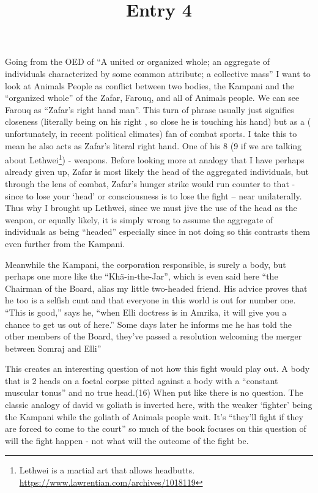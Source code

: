 \documentclass{article}
\title{Entry 4}
\begin{document}
\paragraph{}

Going from the OED of ``A united or organized whole; an aggregate of individuals characterized
by some common attribute; a collective mass'' I want to look at Animals People as conflict between two bodies, the Kampani and the ``organized whole'' of the Zafar, Farouq, and all of Animals people. 
We can see Farouq as ``Zafar’s right hand man''. This turn of phrase usually just signifies closeness (literally being on his right , so close he is touching his hand) but as a ( unfortunately, in recent political climates) fan of combat sports. I take this to mean he also acts as Zafar's literal right hand. One of his 8 (9 if we are talking about Lethwei\footnote{Lethwei is a martial art that allows headbutts. \url{https://www.lawrentian.com/archives/1018119}})  - weapons. Before looking more at analogy that I have perhaps already given up, Zafar is most likely the head of the aggregated individuals, but through the lens of combat, Zafar's hunger strike would run counter to that - since to lose your `head' or consciousness  is to lose the fight -- near unilaterally. Thus why I brought up Lethwei, since we must jive the use of the head as the weapon, or equally likely, it is simply wrong to assume the aggregate of individuals as being ``headed'' especially since in not doing so this contrasts them even further from the Kampani.

Meanwhile the Kampani, the corporation responsible, is surely a body, but perhaps one more like the ``Khã-in-the-Jar'', which is even said here ``the Chairman of the Board, alias my little two-headed friend. His advice proves that he too is a selfish cunt and that everyone in this world is out for number one. “This is good,” says he, “when Elli doctress is in Amrika, it will give you a chance to get us out of here.” Some days later he informs me he has told the other members of the Board, they’ve passed a resolution welcoming the merger between Somraj and Elli'' 

This creates an interesting question of not how this fight would play out. A body that is 2 heads on a foetal corpse pitted against a body with a ``constant muscular tonus'' and no true head.(16) When put like there is no question. The classic analogy of david vs goliath is inverted here, with the weaker `fighter' being the Kampani while the goliath of Animals people wait. It's ``they’ll fight if they are forced to come to the court'' so much of the book focuses on this question of will the fight happen - not what will the outcome of the fight be. 
\end{document}
